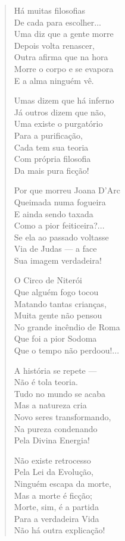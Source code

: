 \begin{verse}
Há muitas filosofias \\
De cada para escolher... \\
Uma diz que a gente morre \\
Depois volta renascer, \\
Outra afirma que na hora \\
Morre o corpo e se evapora \\
E a alma ninguém vê. 

Umas dizem que há inferno \\
Já outros dizem que não, \\
Uma existe o purgatório \\
Para a purificação, \\
Cada tem sua teoria \\
Com própria filosofia \\
Da mais pura ficção! 

Por que morreu Joana D'Arc \\
Queimada numa fogueira \\
E ainda sendo taxada \\
Como a pior feiticeira?...\\
Se ela ao passado voltasse \\
Via de Judas ---  a face \\
Sua imagem verdadeira! 
\pagebreak

O Circo de Niterói \\
Que alguém fogo tocou \\
Matando tantas crianças, \\
Muita gente não pensou \\
No grande incêndio de Roma \\
Que foi a pior Sodoma \\
Que o tempo não perdoou!... 

A história se repete --- \\
Não é tola teoria. \\
Tudo no mundo se acaba \\
Mas a natureza cria \\
Novo seres transformando, \\
Na pureza condenando \\
Pela Divina Energia! 

Não existe retrocesso \\
Pela Lei da Evolução, \\
Ninguém escapa da morte, \\
Mas a morte é ficção; \\
Morte, sim, é a partida \\
Para a verdadeira Vida \\
Não há outra explicação! 


\end{verse}
